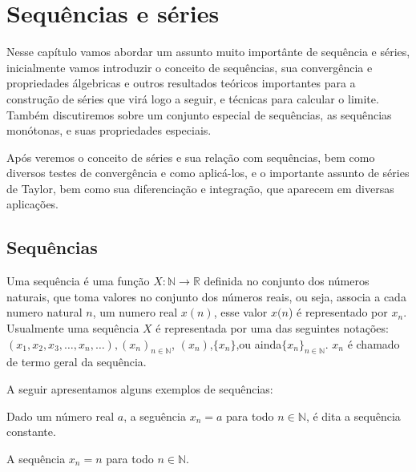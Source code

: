 
\chapter{Sequências e séries}\label{cap:seq_series}

\emconstrucao

Nesse capítulo vamos abordar um assunto muito importânte de sequência e séries,
inicialmente vamos introduzir o conceito de sequências, sua convergência e
propriedades álgebricas e outros resultados teóricos importantes para a 
construção de séries que virá logo a seguir, e técnicas para calcular o limite.
Também discutiremos sobre um conjunto especial de sequências, as sequências
monótonas, e suas propriedades especiais.

Após veremos o conceito de séries e sua relação com sequências, bem como 
diversos testes de convergência e como aplicá-los, e o importante assunto de 
séries de Taylor, bem como sua diferenciação e integração, que aparecem em 
diversas aplicações.

\section{Sequências}
\construirSec

Uma sequência é uma função $X:\mathbb{N} \rightarrow \mathbb{R}$ definida no 
conjunto dos números naturais, que toma valores no conjunto dos números reais, 
ou seja, associa a cada numero natural $n$, um numero real $x(n)$, esse valor 
$x(n$) é representado por $x_n$. Usualmente uma sequência $X$ é representada 
por uma das seguintes notações: $(x_1,x_2,x_3,\dots,x_n,\dots),
(x_n)_{n \in \mathbb{N}}$, $(x_n)$,$\{x_n\}$,ou ainda$\{x_n\}_{n \in \mathbb{N}}$.
$x_n$ é chamado de termo geral da sequência.

A seguir apresentamos alguns exemplos de sequências:
\begin{ex}\label{ex: 1}
Dado um número real $a$, a seguência $x_n = a$ para todo $n \in \mathbb{N}$,
é dita a sequência constante.
\end{ex}

\begin{ex}\label{ex: 2}
A sequência $x_n = n$ para todo $n \in \mathbb{N}$.
\end{ex}

